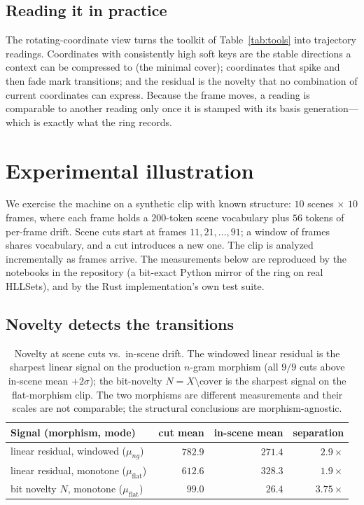 \documentclass[11pt,a4paper]{article}
\theoremstyle{remark}
\begin{document}
\subsection{Reading it in practice}

The rotating-coordinate view turns the toolkit of Table~\ref{tab:tools} into
trajectory readings. Coordinates with consistently high soft keys are the
stable directions a context can be compressed to (the minimal cover);
coordinates that spike and then fade mark transitions; and the residual is the
novelty that no combination of current coordinates can express. Because the
frame moves, a reading is comparable to another reading only once it is stamped
with its basis generation---which is exactly what the ring records.

\section{Experimental illustration}
\label{sec:experiments}

We exercise the machine on a synthetic clip with known structure: $10$ scenes
$\times$ $10$ frames, where each frame holds a $200$-token scene vocabulary plus
$56$ tokens of per-frame drift. Scene cuts start at frames $11,21,\dots,91$; a
window of frames shares vocabulary, and a cut introduces a new one. The clip is
analyzed incrementally as frames arrive. The measurements below are reproduced
by the notebooks in the repository (a bit-exact Python mirror of the ring on
real HLLSets), and by the Rust implementation's own test suite.

\subsection{Novelty detects the transitions}

\begin{table}[t]
\centering
\small
\begin{tabular}{@{}lrrr@{}}
\toprule
Signal (morphism, mode) & cut mean & in-scene mean & separation \\
\midrule
linear residual, windowed ($\mu_{ng}$)~\cite{companion2026} & $782.9$ & $271.4$ & $2.9\times$ \\
linear residual, monotone ($\mu_{\mathrm{flat}}$) & $612.6$ & $328.3$ & $1.9\times$ \\
bit novelty $N$, monotone ($\mu_{\mathrm{flat}}$) & $99.0$ & $26.4$ & $3.75\times$ \\
\bottomrule
\end{tabular}
\caption{Novelty at scene cuts vs.\ in-scene drift. The windowed linear residual
is the sharpest linear signal on the production $n$-gram morphism (all $9/9$
cuts above in-scene mean $+2\sigma$); the bit-novelty $N=X\setminus\mathrm{cover}$
is the sharpest signal on the flat-morphism clip. The two morphisms are
different measurements and their scales are not comparable; the structural
conclusions are morphism-agnostic.}
\label{tab:cuts}
\end{table}
\end{document}
